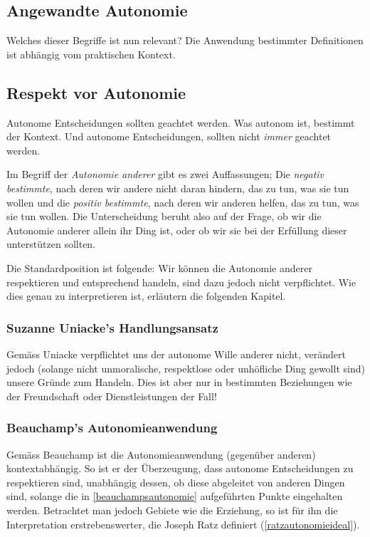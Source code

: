 \documentclass[../main.tex]{subfiles}
\begin{document}
\subsection{Angewandte Autonomie}
Welches dieser Begriffe ist nun relevant? Die Anwendung bestimmter Definitionen ist abhängig vom praktischen Kontext. 

\subsection{Respekt vor Autonomie}
\begin{warningbox}
Autonome Entscheidungen sollten geachtet werden. Was autonom ist, bestimmt der Kontext. Und autonome Entscheidungen, sollten nicht \textit{immer} geachtet werden. 
\end{warningbox}

Im Begriff der \textit{Autonomie anderer} gibt es zwei Auffassungen; Die \textit{negativ bestimmte}, nach deren wir andere nicht daran hindern, das zu tun, was sie tun wollen und die \textit{positiv bestimmte}, nach deren wir anderen helfen, das zu tun, was sie tun wollen. Die Unterscheidung beruht also auf der Frage, ob wir die Autonomie anderer allein ihr Ding ist, oder ob wir sie bei der Erfüllung dieser unterstützen sollten. 

Die Standardposition ist folgende: Wir können die Autonomie anderer respektieren und entsprechend handeln, sind dazu jedoch nicht verpflichtet. Wie dies genau zu interpretieren ist, erläutern die folgenden Kapitel. 

\subsubsection{Suzanne Uniacke's Handlungsansatz}
Gemäss Uniacke verpflichtet uns der autonome Wille anderer nicht, verändert jedoch (solange nicht unmoralische, respektlose oder unhöfliche Ding gewollt sind) unsere Gründe zum Handeln. Dies ist aber nur in bestimmten Beziehungen wie der Freundschaft oder Dienstleistungen der Fall!

\subsubsection{Beauchamp's Autonomieanwendung}
Gemäss Beauchamp ist die Autonomieanwendung (gegenüber anderen) kontextabhängig. So ist er der Überzeugung, dass autonome Entscheidungen zu respektieren sind, unabhängig dessen, ob diese abgeleitet von anderen Dingen sind, solange die in \ref{beauchampsautonomie} aufgeführten Punkte eingehalten werden. Betrachtet man jedoch Gebiete wie die Erziehung, so ist für ihn die Interpretation erstrebenswerter, die Joseph Ratz definiert (\ref{ratzautonomieideal}).
\end{document}
